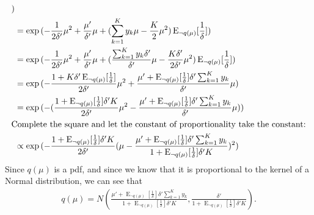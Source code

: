 \documentclass[12pt]{article}
\newcommand{\E}{\operatorname{E}}
\begin{document}
\begin{align}
{    )}
    \nonumber \\
    &= \exp{(-\frac{1}{2\delta'}\mu^2 + \frac{\mu'}{\delta'}\mu
        + (\sum_{k=1}^{K}y_{k}\mu - \frac{K}{2}\mu^2)\E_{\neg q(\mu)}[\frac{1}{\delta}]
    )}
    \nonumber \\
    &= \exp{(-\frac{1}{2\delta'}\mu^2 + \frac{\mu'}{\delta'}\mu
        + (\frac{\sum_{k=1}^{K}y_{k}\delta'}{\delta'}\mu
        - \frac{K\delta'}{2\delta'}\mu^2)\E_{\neg q(\mu)}[\frac{1}{\delta}]
    )}
    \nonumber \\
    &= \exp{(-\frac{1+K\delta'\E_{\neg q(\mu)}[\frac{1}{\delta}]}{2\delta'}\mu^2
    + \frac{\mu' + \E_{\neg q(\mu)}[\frac{1}{\delta}]\delta'\sum_{k=1}^{K}y_{k}}{\delta'}\mu
    )}
    \nonumber \\
    &= \exp{(-(\frac{1+\E_{\neg q(\mu)}[\frac{1}{\delta}]\delta'K}{2\delta'}\mu^2
    - \frac{\mu' + \E_{\neg q(\mu)}[\frac{1}{\delta}]\delta'\sum_{k=1}^{K}y_{k}}{\delta'}\mu
    ))}
    \nonumber \\
    \intertext{Complete the square and let the constant of proportionality take
    the constant:}
    &\propto
    \exp{(-\frac{1+\E_{\neg q(\mu)}[\frac{1}{\delta}]\delta'K}{2\delta'}
    (\mu
    - \frac{
    \mu' + \E_{\neg q(\mu)}[\frac{1}{\delta}]\delta'\sum_{k=1}^{K}y_{k}}
    {1 + \E_{\neg q(\mu)}[\frac{1}{\delta}]\delta'K})^2
    )}
\end{align}
Since $q(\mu)$ is a pdf, and since we know that it is proportional to the kernel
of a Normal distribution, we can see that
\begin{align}\label{eq:qmu}
    q(\mu) = N\left(\frac{\mu' + \E_{\neg q(\mu)}[\frac{1}{\delta}] \delta' \sum_{k=1}^{K}
    y_{k}}{1 + \E_{\neg q(\mu)}[\frac{1}{\delta}]\delta'K}, \frac{\delta'}{1 + \E_{\neg
    q(\mu)}[\frac{1}{\delta}]\delta'K}\right).
\end{align}
\end{document}
